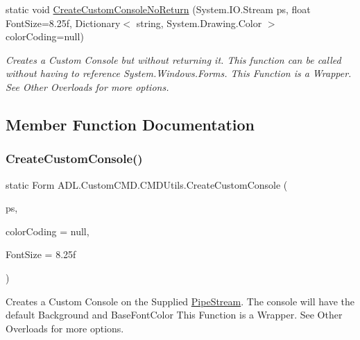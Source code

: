 \begin{DoxyCompactItemize}
static void \mbox{\hyperlink{class_a_d_l_1_1_custom_c_m_d_1_1_c_m_d_utils_a7700a2c5505d3160e33b70fdde89639b}{Create\+Custom\+Console\+No\+Return}} (System.\+I\+O.\+Stream ps, float Font\+Size=8.\+25f, Dictionary$<$ string, System.\+Drawing.\+Color $>$ color\+Coding=null)
\begin{DoxyCompactList}\small\item\em Creates a Custom Console but without returning it. This function can be called without having to reference System.\+Windows.\+Forms. This Function is a Wrapper. See Other Overloads for more options. \end{DoxyCompactList}\end{DoxyCompactItemize}


\subsection{Member Function Documentation}
\mbox{\label{class_a_d_l_1_1_custom_c_m_d_1_1_c_m_d_utils_aef482d360188b9439a20d62f170d7718}} 
\subsubsection{\texorpdfstring{Create\+Custom\+Console()}{CreateCustomConsole()}\hspace{0.1cm}{\footnotesize\ttfamily [1/2]}}
{\footnotesize\ttfamily static Form A\+D\+L.\+Custom\+C\+M\+D.\+C\+M\+D\+Utils.\+Create\+Custom\+Console (\begin{DoxyParamCaption}\item[{\mbox{\hyperlink{class_a_d_l_1_1_pipe_stream}{Pipe\+Stream}}}]{ps,  }\item[{Dictionary$<$ string, System.\+Drawing.\+Color $>$}]{color\+Coding = {\ttfamily null},  }\item[{float}]{Font\+Size = {\ttfamily 8.25f} }\end{DoxyParamCaption})\hspace{0.3cm}{\ttfamily [static]}}



Creates a Custom Console on the Supplied \mbox{\hyperlink{class_a_d_l_1_1_pipe_stream}{Pipe\+Stream}}. The console will have the default Background and Base\+Font\+Color This Function is a Wrapper. See Other Overloads for more options. 


